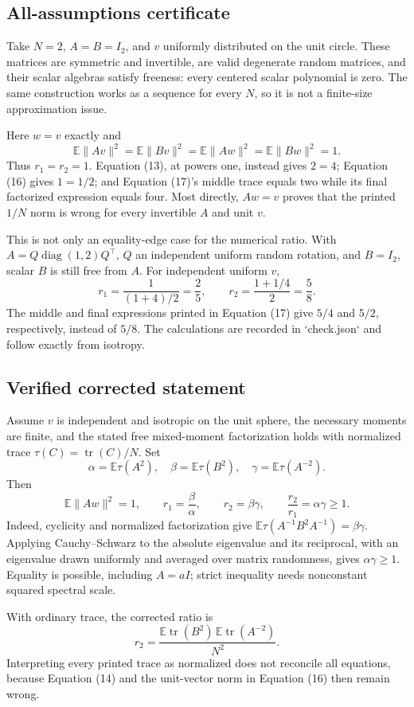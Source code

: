 \documentclass[10pt]{article}
\begin{document}
\subsection*{All-assumptions certificate}
Take \(N=2\), \(A=B=I_2\), and \(v\) uniformly distributed on the unit circle. These matrices are symmetric and invertible, are valid degenerate random matrices, and their scalar algebras satisfy freeness: every centered scalar polynomial is zero. The same construction works as a sequence for every \(N\), so it is not a finite-size approximation issue.\par
Here \(w=v\) exactly and \[\mathbb E\|Av\|^2=\mathbb E\|Bv\|^2
 =\mathbb E\|Aw\|^2=\mathbb E\|Bw\|^2=1.\] Thus \(r_1=r_2=1\). Equation (13), at powers one, instead gives \(2=4\); Equation (16) gives \(1=1/2\); and Equation (17)’s middle trace equals two while its final factorized expression equals four. Most directly, \(Aw=v\) proves that the printed \(1/N\) norm is wrong for every invertible \(A\) and unit \(v\).\par
This is not only an equality-edge case for the numerical ratio. With \(A=Q\operatorname{diag}(1,2)Q^\top\), \(Q\) an independent uniform random rotation, and \(B=I_2\), scalar \(B\) is still free from \(A\). For independent uniform \(v\), \[r_1=\frac1{(1+4)/2}=\frac25,\qquad
 r_2=\frac{1+1/4}{2}=\frac58.\] The middle and final expressions printed in Equation (17) give \(5/4\) and \(5/2\), respectively, instead of \(5/8\). The calculations are recorded in `check.json` and follow exactly from isotropy.\par
\subsection*{Verified corrected statement}
Assume \(v\) is independent and isotropic on the unit sphere, the necessary moments are finite, and the stated free mixed-moment factorization holds with normalized trace \(\tau(C)=\operatorname{tr}(C)/N\). Set \[\alpha=\mathbb E\tau(A^2),\quad
 \beta=\mathbb E\tau(B^2),\quad
 \gamma=\mathbb E\tau(A^{-2}).\] Then \[\mathbb E\|Aw\|^2=1,\qquad
 r_1=\frac{\beta}{\alpha},\qquad
 r_2=\beta\gamma,\qquad
 \frac{r_2}{r_1}=\alpha\gamma\ge1.\] Indeed, cyclicity and normalized factorization give \(\mathbb E\tau(A^{-1}B^2A^{-1})=\beta\gamma\). Applying Cauchy–Schwarz to the absolute eigenvalue and its reciprocal, with an eigenvalue drawn uniformly and averaged over matrix randomness, gives \(\alpha\gamma\ge1\). Equality is possible, including \(A=aI\); strict inequality needs nonconstant squared spectral scale.\par
With ordinary trace, the corrected ratio is \[r_2=\frac{\mathbb E\operatorname{tr}(B^2)\,
                \mathbb E\operatorname{tr}(A^{-2})}{N^2}.\] Interpreting every printed trace as normalized does not reconcile all equations, because Equation (14) and the unit-vector norm in Equation (16) then remain wrong.\par
\end{document}

